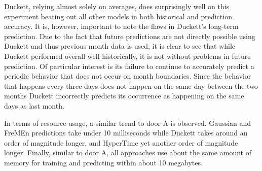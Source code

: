 Duckett, relying almost solely on averages, does surprisingly well on this
experiment beating out all other models in both historical and prediction
accuracy.  It is, however, important to note the flaws in Duckett's long-term
prediction. Due to the fact that future predictions are not directly possible
using Duckett and thus previous month data is used, it is clear to see that
while Duckett performed overall well historically, it is not without problems
in future prediction.  Of particular interest is its failure to continue to
accurately predict a periodic behavior that does not occur on month
boundaries. Since the behavior that happens every three days does not happen
on the same day between the two months Duckett incorrectly predicts its
occurrence as happening on the same days as last month.

In terms of resource usage, a similar trend to door A is observed. Gaussian
and FreMEn predictions take under 10 milliseconds while Duckett takes around
an order of magnitude longer, and HyperTime yet another order of magnitude
longer. Finally, similar to door A, all approaches use about the same amount
of memory for training and predicting within about 10 megabytes.

